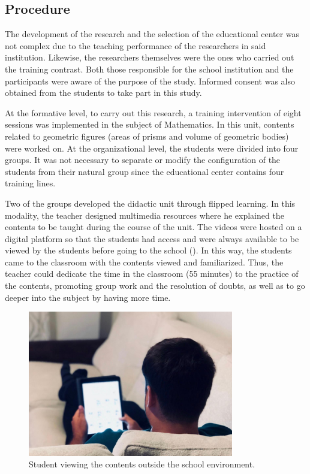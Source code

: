 \documentclass[english]{textolivre}
\begin{document}
\subsection{Procedure}
The development of the research and the selection of the educational center was not complex due to the teaching performance of the researchers in said institution. Likewise, the researchers themselves were the ones who carried out the training contrast. Both those responsible for the school institution and the participants were aware of the purpose of the study. Informed consent was also obtained from the students to take part in this study.

At the formative level, to carry out this research, a training intervention of eight sessions was implemented in the subject of Mathematics. In this unit, contents related to geometric figures (areas of prisms and volume of geometric bodies) were worked on. At the organizational level, the students were divided into four groups. It was not necessary to separate or modify the configuration of the students from their natural group since the educational center contains four training lines.

Two of the groups developed the didactic unit through flipped learning. In this modality, the teacher designed multimedia resources where he explained the contents to be taught during the course of the unit. The videos were hosted on a digital platform so that the students had access and were always available to be viewed by the students before going to the school (). In this way, the students came to the classroom with the contents viewed and familiarized. Thus, the teacher could dedicate the time in the classroom (55 minutes) to the practice of the contents, promoting group work and the resolution of doubts, as well as to go deeper into the subject by having more time.

\begin{figure}[htbp]
 \centering
 \includegraphics[width=0.8\textwidth]{fig-001.jpg}
 \caption{Student viewing the contents outside the school environment.}
 \label{fig1}
\end{figure}
\end{document}
